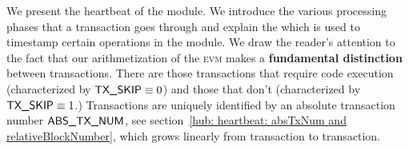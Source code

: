 We present the heartbeat of the \hubMod{} module.
We introduce the various processing phases that a transaction goes through and explain the \hubStamp{} which is used to timestamp certain operations in the \hubMod{} module.
We draw the reader's attention to the fact that our arithmetization of the \textsc{evm} makes a \textbf{fundamental distinction} between transactions.
There are those transactions that require code execution (characterized by $\textsf{TX}\textsf{\_SKIP} \equiv 0$) and those that don't (characterized by $\textsf{TX}\textsf{\_SKIP} \equiv 1$.)
Transactions are uniquely identified by an absolute transaction number $\textsf{ABS\_TX\_NUM}$, see section~\ref{hub: heartbeat: absTxNum and relativeBlockNumber}, which grows linearly from transaction to transaction.
